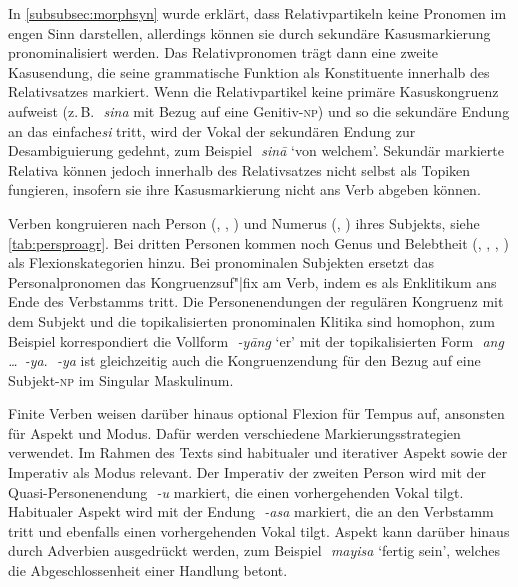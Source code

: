 \documentclass[
	12pt,
	ngerman,
]{scrartcl}
\newcommand{\zwsp}{\mbox{​}} %
\newcommand{\rayr}[2]{\zwsp\smash{{\Tagati #1}} \emph{#2}} %
\newcommand{\xayr}[3]{\zwsp\smash{\Tagati #1} \emph{#2} `#3'} %
\begin{document}

In \cref{subsubsec:morphsyn} wurde erklärt, dass Relativpartikeln keine
Pronomen im engen Sinn darstellen, allerdings können sie durch sekundäre
Kasusmarkierung pronominalisiert werden. Das Relativ\-pronomen trägt dann eine
zweite Kasusendung, die seine grammatische Funktion als Konstituente innerhalb
des Relativsatzes markiert. Wenn die Relativpartikel keine primäre
Kasuskongruenz aufweist (z.\,B. \rayr{sin}{sina} mit Bezug auf eine
Genitiv-\textsc{np}) und so die sekundäre Endung an das einfache \rayr{si}{si}
tritt, wird der Vokal der sekundären Endung zur Desambiguierung gedehnt, zum
Beispiel \xayr{sinaa}{sinā}{von welchem}. Sekundär markierte Relativa können
jedoch innerhalb des Relativsatzes nicht selbst als Topiken fungieren, insofern
sie ihre Kasusmarkierung nicht ans Verb abgeben können.


Verben kongruieren nach Person (\First, \Second, \Third) und Numerus (\Sg,
\Pl) ihres Subjekts, siehe \cref{tab:persproagr}. Bei dritten Personen kommen
noch Genus und Belebtheit (\M, \F, \N, \Inan) als Flexionskategorien hinzu. Bei
pronominalen Subjekten ersetzt das Personalpronomen das Kongruenzsuf"|fix am
Verb, indem es als Enklitikum ans Ende des Verbstamms tritt. Die
Personenendungen der regulären Kongruenz mit dem Subjekt und die
topikalisierten pronominalen Klitika sind homophon, zum Beispiel korrespondiert
die Vollform \xayr{/yaaNF}{-yāng}{er} mit der topikalisierten Form
\rayr{ANF—/y}{ang \dots\ -ya}. \rayr{/y}{-ya} ist gleichzeitig auch die
Kongruenzendung für den Bezug auf eine Subjekt-\textsc{np} im Singular
Maskulinum.

Finite Verben weisen darüber hinaus optional Flexion für Tempus auf, ansonsten
für Aspekt und Modus. Dafür werden verschiedene Markierungsstrategien
verwendet. Im Rahmen des Texts sind habitualer und iterativer Aspekt sowie der
Imperativ als Modus relevant. Der Imperativ der zweiten Person wird mit der
Quasi-Personenendung \rayr{/U}{-u} markiert, die einen vorhergehenden Vokal
tilgt. Habitualer Aspekt wird mit der Endung \rayr{/As}{-asa} markiert, die an
den Verbstamm tritt und ebenfalls einen vorhergehenden Vokal tilgt. Aspekt kann
darüber hinaus durch Adverbien ausgedrückt werden, zum Beispiel
\xayr{myis}{mayisa}{fertig sein}, welches die Abgeschlossenheit einer Handlung
betont.
\end{document}
